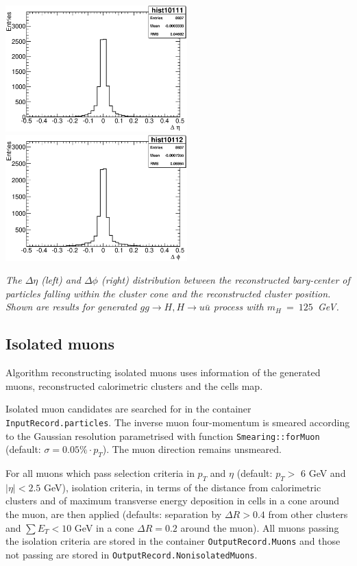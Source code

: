\begin{Fighere}
\begin{center}
   \includegraphics[width=7.0cm,angle=0]{plot-etaclu.eps}
   \includegraphics[width=7.0cm,angle=0]{plot-phiclu.eps}
\end{center}
\caption{\em
The $\Delta \eta$ (left) and  $\Delta \phi$ (right) distribution
between the reconstructed bary-center of particles falling within the
cluster cone  and the reconstructed cluster position. Shown are results 
for generated  $gg \to H, H \to u \bar u$ process with $m_H~=~125$~GeV.
\label{FS2.1}} 
\end{Fighere}


\boldmath 
\subsection{Isolated muons}
\unboldmath

Algorithm reconstructing isolated muons uses information
of the generated muons, reconstructed calorimetric clusters and
the cells map.

Isolated muon candidates are searched for in the container
{\tt InputRecord.particles}. The inverse muon four-momentum is
smeared according to the Gaussian resolution parametrised with
function {\tt Smearing::forMuon} (default: $\sigma = 0.05\% \cdot p_{T}$).
 The muon direction remains unsmeared.

For all muons which pass selection criteria in $p_T$ and $\eta$
(default: $p_T >$ 6 GeV and $|\eta| < 2.5$ GeV), isolation criteria,
in terms of the distance from calorimetric  clusters and of
maximum transverse energy 
deposition in cells in a cone around the muon, are then applied
(defaults: separation by $\Delta R > 0.4$ from other clusters and
$\sum E_T < 10$ GeV in a cone  $\Delta R = 0.2$ around the muon).
All muons passing the isolation criteria are stored in the container
{\tt OutputRecord.Muons} and those not passing are stored in
 {\tt OutputRecord.NonisolatedMuons}. 
 
